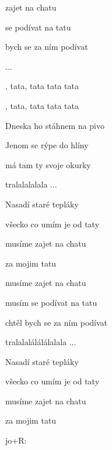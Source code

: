 
\zs
{} zajet na chatu

 se podívat na tatu

 bych se za ním podívat

 ...

       

\ks
\zr

, tata,  tata tata tata 

, tata,  tata tata tata 

\kr
\zs
Dneska ho stáhnem na pivo

Jenom se rýpe do hlíny

má tam ty svoje okurky

tralalalalala ...

\ks
\zs

Nasadí staré tepláky

všecko co umím je od taty

musíme zajet na chatu

za mojim tatu

\ks
\zs

musíme zajet na chatu

musím se podívat na tatu

chtěl bych se za ním podívat

tralalalálálálalala ...

\ks
\zs

Nasadí staré tepláky

všecko co umím je od taty

musíme zajet na chatu

za mojim tatu

\ks
\zr

jo+R:

\kr
\kp





